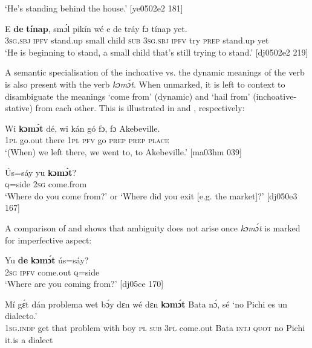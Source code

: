 \glt ‘He’s standing behind the house.’ [ye0502e2 181]
\z


\ea%
    \label{ex:key:307}
    \gll E    \textbf{de} \textbf{tínap},  smɔ́l  pikín  wé  e    de  tráy
fɔ    tínap  yet.\\
\textsc{3sg.sbj}  \textsc{ipfv}  stand.up  small  child  \textsc{sub}  \textsc{3sg.sbj}  \textsc{ipfv}  try
\textsc{prep}    stand.up  yet\\

\glt ‘He is beginning to stand, a small child that’s still trying to stand.’ [dj0502e2 219]
\z

A semantic specialisation of the inchoative vs. the dynamic meanings of the verb is also present with the verb \textit{kɔmɔ́t}. When unmarked, it is left to context to disambiguate the meanings ‘come from’ (dynamic) and ‘hail from’ (inchoative-stative) from each other. This is illustrated in  and , respectively:


\ea%
    \label{ex:key:308}
    \gll Wi  \textbf{kɔmɔ́t}  dé,    wi  kán  gó  fɔ,  fɔ  Akebeville.\\
\textsc{1pl}  go.out  there  \textsc{1pl}  \textsc{pfv}  go  \textsc{prep}  \textsc{prep}  \textsc{place}\\

\glt ‘(When) we left there, we went to, to Akebeville.’ [ma03hm 039]
\z


\ea%
    \label{ex:key:309}
    \gll \'{U}s=sáy  yu  \textbf{kɔmɔ́t}?\\
\textsc{q}=side  \textsc{2sg}  come.from\\

\glt ‘Where do you come from?' or ‘Where did you exit [e.g. the market]?’ [dj050e3 167]
\z

A comparison of  and  shows that ambiguity does not arise once \textit{kɔmɔ́t} is marked for imperfective aspect:


\ea%
    \label{ex:key:310}
    \gll Yu  \textbf{de} \textbf{kɔmɔ́t}    ús=sáy?\\
\textsc{2sg}  \textsc{ipfv}  come.out  \textsc{q}=side\\

\glt ‘Where are you coming from?’ [dj05ce 170]
\z


\ea%
    \label{ex:key:311}
    \gll Mí    gɛ́t  dán  problema  wet    bɔ́y  dɛn  wé  dɛn  \textbf{kɔmɔ́t}
Bata    nɔ́,  sé    ‘no  Pichi  es  un  dialecto.’\\
\textsc{1sg.indp}  get  that  problem    with    boy  \textsc{pl}  \textsc{sub}  \textsc{3pl}  come.out
Bata    \textsc{intj}  \textsc{quot}    no  Pichi  it.is  a  dialect\\

